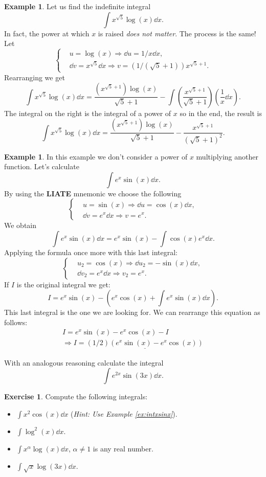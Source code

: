 \documentclass[12pt]{article}
\theoremstyle{plain}
\theoremstyle{definition}
\newtheorem{Ex}[Th]{Example}           %
\newtheorem{Ej}[Th]{Exercise}         %
\theoremstyle{remark}
\newcommand{\al}{\alpha}            %
\renewcommand{\:}{\colon}           %
\newcommand{\un}[1]{\underline{#1}}
\renewcommand{\.}{\Cdot}                %
\newcommand{\To}{\Rightarrow}
\begin{document}
\begin{multicols}{2}
\begin{Ex}
  Let us find the indefinite integral 
  $$\int x^{\sqrt{5}}\log(x)\dd x.$$
  In fact, the power at which $x$ is raised \emph{does not matter}. The process is the same! Let 
  $$
  \left\lbrace
  \begin{aligned}
    &u=\log(x)\To\dd u=1/x\dd x,\\
    &\dd v= x^{\sqrt{5}}\dd x\To v=(1/(\sqrt{5}+1))x^{\sqrt{5}+1}.
  \end{aligned}
  \right.
  $$
Rearranging we get
$$\int x^{\sqrt{5}}\log(x)\dd x=\frac{(x^{\sqrt{5}+1})\log(x)}{\sqrt{5}+1}-\int\left(\frac{x^{\sqrt{5}+1}}{\sqrt{5}+1}\right)\left(\frac{1}{x}\dd x\right).$$
The integral on the right is the integral of a power of $x$ so in the end, the result is 
$$\int x^{\sqrt{5}}\log(x)\dd x=\frac{(x^{\sqrt{5}+1})\log(x)}{\sqrt{5}+1}-\frac{x^{\sqrt{5}+1}}{(\sqrt{5}+1)^2}.$$
\end{Ex}
\vfill\null\columnbreak
\begin{Ex}
  In this example we don't consider a power of $x$ multiplying another function. Let's calculate
  $$\int e^x\sin(x)\dd x.$$
  By using the \textbf{LIATE} mnemonic we choose the following
  $$
  \left\lbrace
  \begin{aligned}
    &u=\sin(x)\To\dd u=\cos(x)\dd x,\\
    &\dd v= e^x\dd x\To v=e^x.
  \end{aligned}
  \right.
  $$
  We obtain 
  $$\int e^x\sin(x)\dd x=e^x\sin(x)-\int\cos(x)e^x\dd x.$$
  Applying the formula once more with this last integral:
  $$
  \left\lbrace
  \begin{aligned}
    &u_2=\cos(x)\To\dd u_2=-\sin(x)\dd x,\\
    &\dd v_2= e^x\dd x\To v_2=e^x.
  \end{aligned}
  \right.
  $$
 If $I$ is the original integral we get:
 $$I=e^x\sin(x)-\left(e^x\cos(x)+\int e^x\sin(x)\dd x\right).$$
This last integral is the one we are looking for. We can rearrange this equation as follows:
\begin{gather*}
  I=e^x\sin(x)-e^x\cos(x)-I\\
  \To I=\un{(1/2)(e^x\sin(x)-e^x\cos(x))}
\end{gather*}
\end{Ex}

\begin{ptcbP}
  With an analogous reasoning calculate the integral
  $$\int e^{2x}\sin(3x)\dd x.$$
\end{ptcbP}
\begin{Ej}
  Compute the following integrals:
  \vspace{-0.4em}
  \begin{itemize}
    \itemsep=-0.3em
    \item $\int x^2\cos(x)\dd x$ (\emph{Hint: Use Example \ref{ex:intxsinx}}).
    \item $\int\log^2(x)\dd x$.
    \item $\int x^\al\log(x)\dd x$, $\al\neq 1$ is any real number.
    \item $\int \sqrt{x}\log(3x)\dd x$.
  \end{itemize}
\end{Ej}
\vfill\null
\end{multicols}
\end{document}
